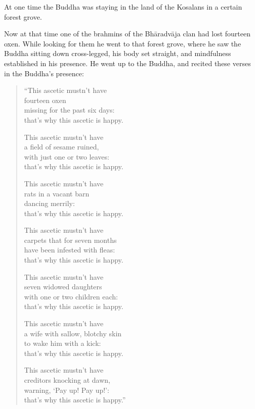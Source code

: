 \documentclass[12pt,openany]{book}%
\begin{document}
At one time the Buddha was staying in the land of the Kosalans in a certain forest grove. 

Now at that time one of the brahmins of the \textsanskrit{Bhāradvāja} clan had lost fourteen oxen. While looking for them he went to that forest grove, where he saw the Buddha sitting down cross-legged, his body set straight, and mindfulness established in his presence. He went up to the Buddha, and recited these verses in the Buddha’s presence: 

\begin{verse}%
“This ascetic mustn’t have \\
fourteen oxen \\
missing for the past six days: \\
that’s why this ascetic is happy. 

This ascetic mustn’t have \\
a field of sesame ruined, \\
with just one or two leaves: \\
that’s why this ascetic is happy. 

This ascetic mustn’t have \\
rats in a vacant barn \\
dancing merrily: \\
that’s why this ascetic is happy. 

This ascetic mustn’t have \\
carpets that for seven months \\
have been infested with fleas: \\
that’s why this ascetic is happy. 

This ascetic mustn’t have \\
seven widowed daughters \\
with one or two children each: \\
that’s why this ascetic is happy. 

This ascetic mustn’t have \\
a wife with sallow, blotchy skin \\
to wake him with a kick: \\
that’s why this ascetic is happy. 

This ascetic mustn’t have \\
creditors knocking at dawn, \\
warning, ‘Pay up! Pay up!’: \\
that’s why this ascetic is happy.” 


\end{verse}
\end{document}
